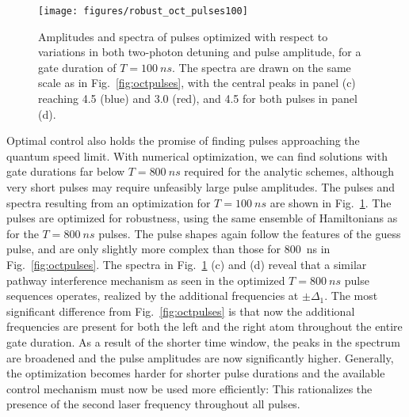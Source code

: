 \begin{figure}[tb]
  \centering
  \texttt{[image: figures/robust\_oct\_pulses100]}
  \caption{%
  Amplitudes and spectra of pulses optimized with respect to variations
  in both two-photon detuning and pulse amplitude, for a gate duration of
  $T=\SI{100}{ns}$. The spectra are drawn on the same scale as in
  Fig.~\ref{fig:octpulses}, with the central peaks in panel (c) reaching 4.5
  (blue) and 3.0 (red), and 4.5 for both pulses in panel (d).
  }
  \label{fig:octpulses100}
\end{figure}
Optimal control also holds the promise of finding pulses approaching the quantum
speed limit. With numerical optimization, we can find solutions with
gate durations far below $T=\SI{800}{ns}$
required for the analytic schemes, although very short pulses may require
unfeasibly large pulse amplitudes.
The pulses and spectra resulting from an
optimization for $T=\SI{100}{ns}$ are shown in Fig.~\ref{fig:octpulses100}. The
pulses are optimized for robustness, using the same ensemble of Hamiltonians
as for the $T=\SI{800}{ns}$ pulses. The pulse shapes again follow the features of the
guess pulse, and are only slightly more complex than those for \SI{800}{ns} in
Fig.~\ref{fig:octpulses}.
The spectra in Fig.~\ref{fig:octpulses100} (c) and (d)  reveal that
a similar pathway interference 
mechanism as seen in the optimized  $T=\SI{800}{ns}$ pulse sequences 
operates, realized by the additional frequencies at $\pm
\Delta_1$. The most significant 
difference from Fig.~\ref{fig:octpulses} is that now the additional frequencies
are present for both the left and the right atom throughout the entire gate
duration. As a result of the shorter time window, 
the peaks in the spectrum are broadened and the
pulse amplitudes are now significantly higher. Generally, the optimization
becomes harder for shorter pulse durations and the available control
mechanism must now be used more efficiently: This rationalizes the
presence of the 
second laser frequency throughout all pulses.

